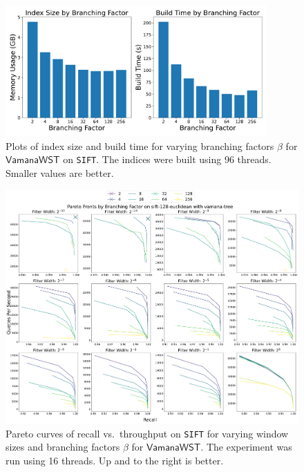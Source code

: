 \documentclass{article}
\theoremstyle{plain}
\theoremstyle{definition}
\theoremstyle{remark}
\newcommand{\datasetname}[1]{\texttt{#1}}
\newcommand{\algname}[1]{\ensuremath{\mathsf{#1}}}
\begin{document}
\begin{figure}
    \centering
    \includegraphics[width=10cm]{images/vamana_memory_build_time.pdf}
    \caption{Plots of index size and build time for varying branching factors $\beta$ for \algname{Vamana WST} on \datasetname{SIFT}. The indices were built using 96 threads. Smaller values are better. }
    \label{fig:branching_buildtime_memory}
\end{figure}

\begin{figure}
    \centering
    \includegraphics[width=16cm]{images/sift-128-euclidean_branching_results.pdf}
    \caption{Pareto curves of recall vs.\ throughput on \datasetname{SIFT} for varying window sizes and branching factors $\beta$ for \algname{Vamana WST}. The experiment was run using 16 threads. Up and to the right is better.}
    \label{fig:full_branching_filter_widths}
\end{figure}
\end{document}
